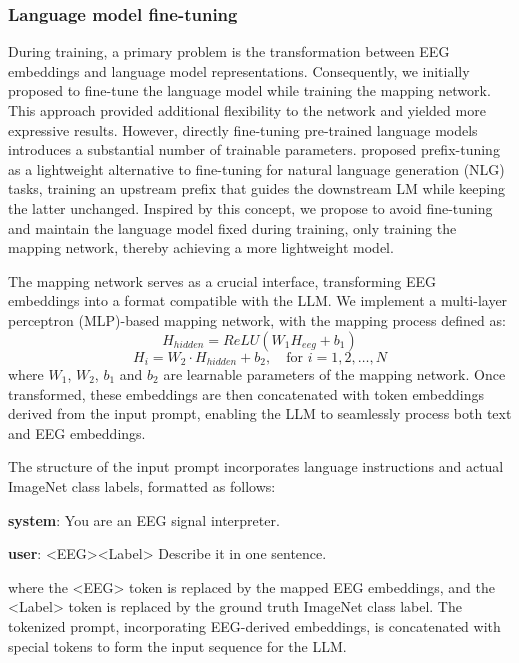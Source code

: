 \documentclass[sigconf]{acmart}
\begin{document}
\subsubsection*{\textbf{Language model fine-tuning}}
During training, a primary problem is the transformation between EEG embeddings and language model representations. Consequently, we initially proposed to fine-tune the language model while training the mapping network. This approach provided additional flexibility to the network and yielded more expressive results. However, directly fine-tuning pre-trained language models introduces a substantial number of trainable parameters. \cite{li2021prefix} proposed prefix-tuning as a lightweight alternative to fine-tuning for natural language generation (NLG) tasks, training an upstream prefix that guides the downstream LM while keeping the latter unchanged. Inspired by this concept, we propose to avoid fine-tuning and maintain the language model fixed during training, only training the mapping network, thereby achieving a more lightweight model.

The mapping network serves as a crucial interface, transforming EEG embeddings into a format compatible with the LLM. We implement a multi-layer perceptron (MLP)-based mapping network, with the mapping process defined as:
\begin{equation}
H_{hidden} = ReLU(W_1H_{eeg} + b_1)
\end{equation}
\begin{equation}
H_i = W_2 \cdot H_{hidden} + b_2, \quad \text{for } i = 1,2,\ldots, N
\end{equation}
where $W_1$, $W_2$, $b_1$ and $b_2$ are learnable parameters of the mapping network. Once transformed, these embeddings are then concatenated with token embeddings derived from the input prompt, enabling the LLM to seamlessly process both text and EEG embeddings.

The structure of the input prompt incorporates language instructions and actual ImageNet class labels, formatted as follows:
\begin{tcolorbox}[colback=gray!10,colframe=white]
\textbf{system}: You are an EEG signal interpreter.

\textbf{user}: <EEG><Label> Describe it in one sentence.
\end{tcolorbox}
\noindent where the <EEG> token is replaced by the mapped EEG embeddings, and the <Label> token is replaced by the ground truth ImageNet class label. The tokenized prompt, incorporating EEG-derived embeddings, is concatenated with special tokens to form the input sequence for the LLM.
\end{document}
